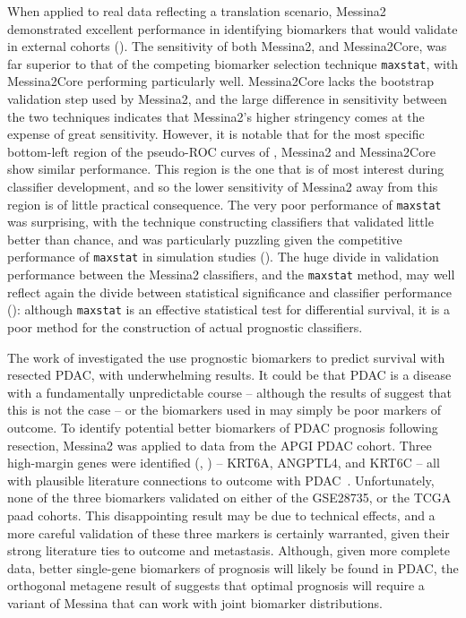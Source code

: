\documentclass[dissertation.tex]{subfiles}
\begin{document}
When applied to real data reflecting a translation scenario, Messina2 demonstrated excellent performance in identifying biomarkers that would validate in external cohorts ().  The sensitivity of both Messina2, and Messina2Core, was far superior to that of the competing biomarker selection technique \texttt{maxstat}, with Messina2Core performing particularly well.  Messina2Core lacks the bootstrap validation step used by Messina2, and the large difference in sensitivity between the two techniques indicates that Messina2's higher stringency comes at the expense of great sensitivity.  However, it is notable that for the most specific bottom-left region of the pseudo-\gls{ROC} curves of , Messina2 and Messina2Core show similar performance.  This region is the one that is of most interest during classifier development, and so the lower sensitivity of Messina2 away from this region is of little practical consequence.  The very poor performance of \texttt{maxstat} was surprising, with the technique constructing classifiers that validated little better than chance, and was particularly puzzling given the competitive performance of \texttt{maxstat} in simulation studies ().  The huge divide in validation performance between the Messina2 classifiers, and the \texttt{maxstat} method, may well reflect again the divide between statistical significance and classifier performance (): although \texttt{maxstat} is an effective statistical test for differential survival, it is a poor method for the construction of actual prognostic classifiers.

The work of  investigated the use prognostic biomarkers to predict survival with resected \gls{PDAC}, with underwhelming results.  It could be that \gls{PDAC} is a disease with a fundamentally unpredictable course -- although the results of  suggest that this is not the case -- or the biomarkers used in  may simply be poor markers of outcome.  To identify potential better biomarkers of \gls{PDAC} prognosis following resection, Messina2 was applied to data from the \gls{APGI} \gls{PDAC} cohort.  Three high-margin genes were identified (, ) -- KRT6A, ANGPTL4, and KRT6C -- all with plausible literature connections to outcome with \gls{PDAC}~\cite{Adhikary2013,Choi2014,Kim2011b,Livasy2006,Padua2008,VandenBroeck2012,Xiao2012}.  Unfortunately, none of the three biomarkers validated on either of the GSE28735, or the \gls{TCGA} paad cohorts.  This disappointing result may be due to technical effects, and a more careful validation of these three markers is certainly warranted, given their strong literature ties to outcome and metastasis.  Although, given more complete data, better single-gene biomarkers of prognosis will likely be found in \gls{PDAC}, the orthogonal metagene result of  suggests that optimal prognosis will require a variant of Messina that can work with joint biomarker distributions.
\end{document}

